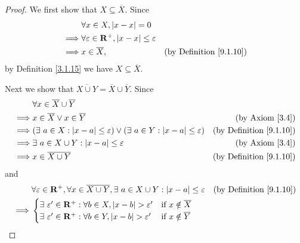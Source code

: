 \begin{proof}
    We first show that \(X \subseteq \overline{X}\).
    Since
    \begin{align*}
                 & \forall x \in X, \left\lvert x - x\right\rvert = 0                                                                 \\
        \implies & \forall \varepsilon \in \mathbf{R}^+, \left\lvert x - x\right\rvert \leq \varepsilon                                       \\
        \implies & x \in \overline{X},                                        & \text{(by Definition \ref{9.1.10})}
    \end{align*}
    by Definition \ref{3.1.15} we have \(X \subseteq \overline{X}\).

    Next we show that \(\overline{X \cup Y} = \overline{X} \cup \overline{Y}\).
    Since
    \begin{align*}
                 & \forall x \in \overline{X} \cup \overline{Y}                                                                                                   \\
        \implies & x \in \overline{X} \lor x \in \overline{Y}                                                               & \text{(by Axiom \ref{3.4})}         \\
        \implies & (\exists\ a \in X : \left\lvert x - a\right\rvert \leq \varepsilon) \lor (\exists\ a \in Y : \left\lvert x - a\right\rvert \leq \varepsilon) & \text{(by Definition \ref{9.1.10})} \\
        \implies & \exists\ a \in X \cup Y : \left\lvert x - a\right\rvert \leq \varepsilon                                                   & \text{(by Axiom \ref{3.4})}         \\
        \implies & x \in \overline{X \cup Y}                                                                                & \text{(by Definition \ref{9.1.10})}
    \end{align*}
    and
    \begin{align*}
                 & \forall \varepsilon \in \mathbf{R}^+, \forall x \in \overline{X \cup Y}, \exists\ a \in X \cup Y : \left\lvert x - a\right\rvert \leq \varepsilon & \text{(by Definition \ref{9.1.10})} \\
        \implies & \begin{cases}
                       \exists\ \varepsilon' \in \mathbf{R}^+ : \forall b \in X, \left\lvert x - b\right\rvert > \varepsilon' & \text{if } x \notin \overline{X} \\
                       \exists\ \varepsilon' \in \mathbf{R}^+ : \forall b \in Y, \left\lvert x - b\right\rvert > \varepsilon' & \text{if } x \notin \overline{Y}

\end{cases}
\end{align*}
\end{proof}
